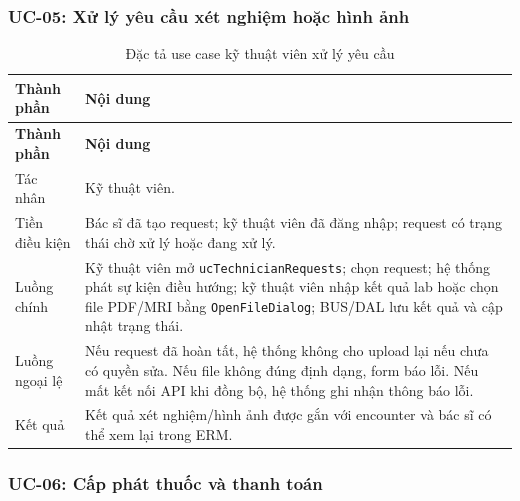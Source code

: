 \documentclass[12pt,a4paper]{article}
\numberwithin{figure}{subsection}
\numberwithin{table}{subsection}
\begin{document}
\subsubsection{UC-05: Xử lý yêu cầu xét nghiệm hoặc hình ảnh}

\begin{longtable}{|p{3.4cm}|p{10.4cm}|}
\caption{Đặc tả use case kỹ thuật viên xử lý yêu cầu} \\
\hline
\textbf{Thành phần} & \textbf{Nội dung} \\
\hline
\endfirsthead
\hline
\textbf{Thành phần} & \textbf{Nội dung} \\
\hline
\endhead
Tác nhân & Kỹ thuật viên. \\
\hline
Tiền điều kiện & Bác sĩ đã tạo request; kỹ thuật viên đã đăng nhập; request có trạng thái chờ xử lý hoặc đang xử lý. \\
\hline
Luồng chính & Kỹ thuật viên mở \texttt{ucTechnicianRequests}; chọn request; hệ thống phát sự kiện điều hướng; kỹ thuật viên nhập kết quả lab hoặc chọn file PDF/MRI bằng \texttt{OpenFileDialog}; BUS/DAL lưu kết quả và cập nhật trạng thái. \\
\hline
Luồng ngoại lệ & Nếu request đã hoàn tất, hệ thống không cho upload lại nếu chưa có quyền sửa. Nếu file không đúng định dạng, form báo lỗi. Nếu mất kết nối API khi đồng bộ, hệ thống ghi nhận thông báo lỗi. \\
\hline
Kết quả & Kết quả xét nghiệm/hình ảnh được gắn với encounter và bác sĩ có thể xem lại trong ERM. \\
\hline
\end{longtable}

\subsubsection{UC-06: Cấp phát thuốc và thanh toán}
\end{document}
